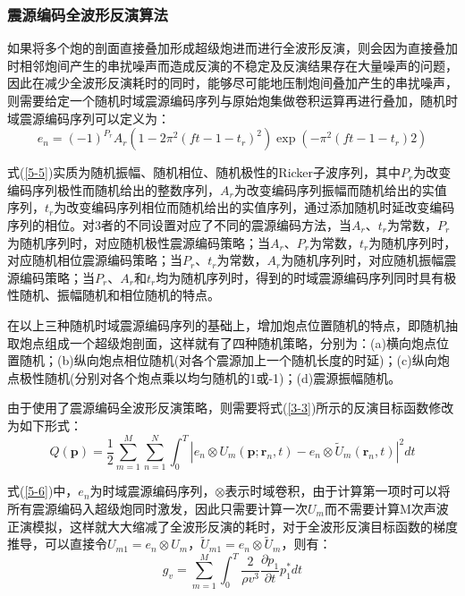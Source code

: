 \documentclass[12pt]{article}
\begin{document}
\subsubsection{震源编码全波形反演算法}
如果将多个炮的剖面直接叠加形成超级炮进而进行全波形反演，则会因为直接叠加时相邻炮间产生的串扰噪声而造成反演的不稳定及反演结果存在大量噪声的问题，因此在减少全波形反演耗时的同时，能够尽可能地压制炮间叠加产生的串扰噪声，则需要给定一个随机时域震源编码序列与原始炮集做卷积运算再进行叠加，随机时域震源编码序列可以定义为：
\begin{equation}\label{5-5}
e_n=(-1)^{P_r}A_r(1-2\pi^2(ft-1-t_r)^2)\exp(-\pi^2(ft-1-t_r)2)
\end{equation}
\par
式(\ref{5-5})实质为随机振幅、随机相位、随机极性的Ricker子波序列，其中$P_r$为改变编码序列极性而随机给出的整数序列，$A_r$为改变编码序列振幅而随机给出的实值序列，$t_r$为改变编码序列相位而随机给出的实值序列，通过添加随机时延改变编码序列的相位。对3者的不同设置对应了不同的震源编码方法，当$A_r$、$t_r$为常数，$P_r$为随机序列时，对应随机极性震源编码策略；当$A_r$、$P_r$为常数，$t_r$为随机序列时，对应随机相位震源编码策略；当$P_r$、$t_r$为常数，$A_r$为随机序列时，对应随机振幅震源编码策略；当$P_r$、$A_r$和$t_r$均为随机序列时，得到的时域震源编码序列同时具有极性随机、振幅随机和相位随机的特点。
\par
在以上三种随机时域震源编码序列的基础上，增加炮点位置随机的特点，即随机抽取炮点组成一个超级炮剖面，这样就有了四种随机策略，分别为：(a)横向炮点位置随机；(b)纵向炮点相位随机(对各个震源加上一个随机长度的时延)；(c)纵向炮点极性随机(分别对各个炮点乘以均匀随机的1或-1)；(d)震源振幅随机。
\par
由于使用了震源编码全波形反演策略，则需要将式(\ref{3-3})所示的反演目标函数修改为如下形式：
\begin{equation}\label{5-6}
Q(\boldsymbol{p})=\frac{1}{2}\sum_{m=1}^{M}\sum_{n=1}^{N}\int_{0}^{T} |e_n \otimes U_m(\boldsymbol{p};\boldsymbol{r}_n,t)-e_n \otimes \tilde{U}_m(\boldsymbol{r}_n,t)|^2dt
\end{equation}
\par
式(\ref{5-6})中，$e_n$为时域震源编码序列，$\otimes$表示时域卷积，由于计算第一项时可以将所有震源编码入超级炮同时激发，因此只需要计算一次$U_m$而不需要计算M次声波正演模拟，这样就大大缩减了全波形反演的耗时，对于全波形反演目标函数的梯度推导，可以直接令$U_{m1}=e_n \otimes U_m$，$\tilde{U}_{m1}=e_n \otimes \tilde{U}_m$，则有：
\begin{equation}\label{5-7}
g_{v}=\sum_{m=1}^M \int_0^T \frac{2}{\rho v^3}\frac{\partial p_1}{\partial t}p_1^*dt
\end{equation}
\end{document}
